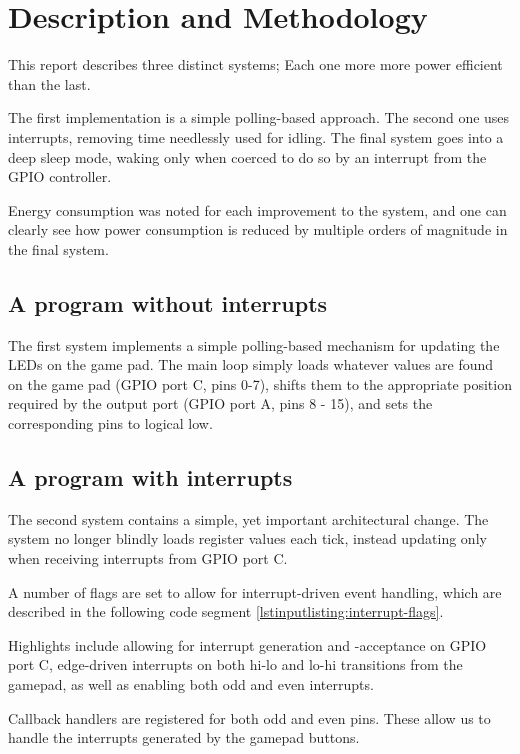 \section{Description and Methodology}

This report describes three distinct systems; Each one more more power efficient than the last.

The first implementation is a simple polling-based approach. The second one uses interrupts, removing time needlessly used for idling. The final system goes into a deep sleep mode, waking only when coerced to do so by an interrupt from the GPIO controller.

Energy consumption was noted for each improvement to the system, and one can clearly see how power consumption is reduced by multiple orders of magnitude in the final system.

\subsection{A program without interrupts}

The first system implements a simple polling-based mechanism for updating the LEDs on the game pad. The main loop simply loads whatever values are found on the game pad (GPIO port C, pins 0-7), shifts them to the appropriate position required by the output port (GPIO port A, pins 8 - 15), and sets the corresponding pins to logical low.

\subsection{A program with interrupts}

The second system contains a simple, yet important architectural change. The system no longer blindly loads register values each tick, instead updating only when receiving interrupts from GPIO port C.

A number of flags are set to allow for interrupt-driven event handling, which are described in the following code segment \ref{lstinputlisting:interrupt-flags}.

Highlights include allowing for interrupt generation and -acceptance on GPIO port C, edge-driven interrupts on both hi-lo and lo-hi transitions from the gamepad, as well as enabling both odd and even interrupts.


\label{lstinputlisting:interrupt-flags}

Callback handlers are registered for both odd and even pins. These allow us to handle the interrupts generated by the gamepad buttons.

